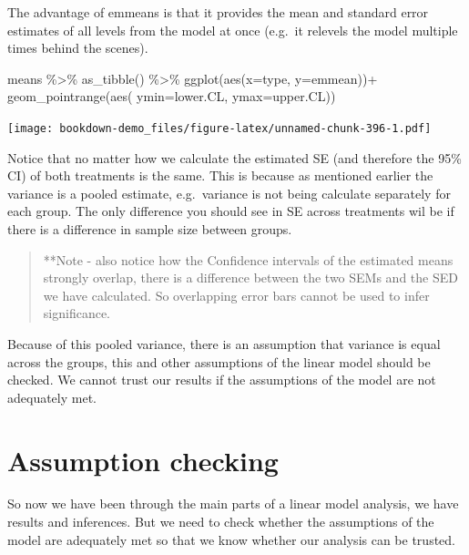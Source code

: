 \documentclass[
]{book}
\newenvironment{Shaded}{\begin{snugshade}}{\end{snugshade}}
\newcommand{\AttributeTok}[1]{\textcolor[rgb]{0.77,0.63,0.00}{#1}}
\newcommand{\FunctionTok}[1]{\textcolor[rgb]{0.00,0.00,0.00}{#1}}
\newcommand{\NormalTok}[1]{#1}
\newcommand{\SpecialCharTok}[1]{\textcolor[rgb]{0.00,0.00,0.00}{#1}}
\begin{document}
The advantage of emmeans is that it provides the mean and standard error estimates of all levels from the model at once (e.g.~it relevels the model multiple times behind the scenes).

\begin{Shaded}
\begin{Highlighting}[]
\NormalTok{means }\SpecialCharTok{\%\textgreater{}\%} 
  \FunctionTok{as\_tibble}\NormalTok{() }\SpecialCharTok{\%\textgreater{}\%} 
  \FunctionTok{ggplot}\NormalTok{(}\FunctionTok{aes}\NormalTok{(}\AttributeTok{x=}\NormalTok{type, }
             \AttributeTok{y=}\NormalTok{emmean))}\SpecialCharTok{+}
  \FunctionTok{geom\_pointrange}\NormalTok{(}\FunctionTok{aes}\NormalTok{(}
    \AttributeTok{ymin=}\NormalTok{lower.CL, }
    \AttributeTok{ymax=}\NormalTok{upper.CL))}
\end{Highlighting}
\end{Shaded}

\texttt{[image: bookdown-demo\_files/figure-latex/unnamed-chunk-396-1.pdf]}

Notice that no matter how we calculate the estimated SE (and therefore the 95\% CI) of both treatments is the same. This is because as mentioned earlier the variance is a pooled estimate, e.g.~variance is not being calculate separately for each group. The only difference you should see in SE across treatments wil be if there is a difference in sample size between groups.

\begin{quote}
**Note - also notice how the Confidence intervals of the estimated means strongly overlap, there is a difference between the two SEMs and the SED we have calculated. So overlapping error bars cannot be used to infer significance.
\end{quote}

Because of this pooled variance, there is an assumption that variance is equal across the groups, this and other assumptions of the linear model should be checked. We cannot trust our results if the assumptions of the model are not adequately met.

\hypertarget{assumption-checking}{%
\section{Assumption checking}\label{assumption-checking}}

So now we have been through the main parts of a linear model analysis, we have results and inferences. But we need to check whether the assumptions of the model are adequately met so that we know whether our analysis can be trusted.
\end{document}
